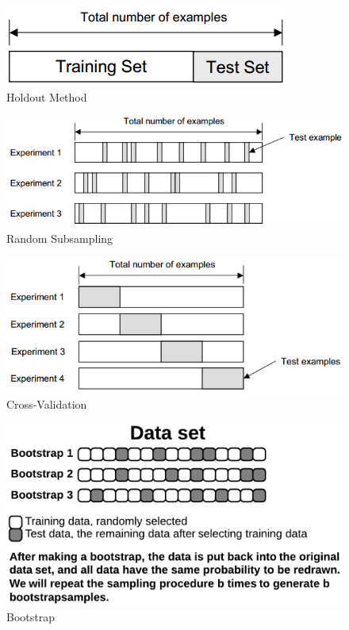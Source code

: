 		\clearpage

		\begin{figure}[H]
			\centering
			\includegraphics[scale=0.5]{pics/holdout.png}
			\caption{Holdout Method}
		\end{figure}

		\begin{figure}[H]
			\centering
			\includegraphics[scale=0.5]{pics/randomsubsampling.png}
			\caption{Random Subsampling}
		\end{figure}

		\begin{figure}[H]
			\centering
			\includegraphics[scale=0.5]{pics/kfold.png}
			\caption{Cross-Validation}
		\end{figure}

		\begin{figure}[H]
			\centering
			\includegraphics[scale=0.3]{pics/bootstrap.png}
			\caption{Bootstrap}
		\end{figure}

